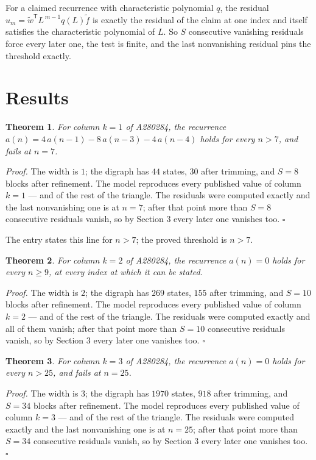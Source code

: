 \documentclass[11pt]{article}
\newtheorem{theorem}{Theorem}
\theoremstyle{definition}
\begin{document}
For a claimed recurrence with characteristic polynomial $q$, the residual $u_m = \tilde w^{\mathsf T}L^{\,m-1}q(L)\tilde f$ is exactly the residual of the claim at one index and itself satisfies the characteristic polynomial of $L$. So $S$ consecutive vanishing residuals force every later one, the test is finite, and the last nonvanishing residual pins the threshold exactly.

\section{Results}

\begin{theorem} For column $k = 1$ of A280284, the recurrence $a(n) = 4\,a(n-1) - 8\,a(n-3) - 4\,a(n-4)$ holds for every $n > 7$, and fails at $n = 7$.\end{theorem}

{\itshape Proof.} The width is $1$; the digraph has $44$ states, $30$ after trimming, and $S = 8$ blocks after refinement. The model reproduces every published value of column $k = 1$ --- and of the rest of the triangle. The residuals were computed exactly and the last nonvanishing one is at $n = 7$; after that point more than $S = 8$ consecutive residuals vanish, so by Section 3 every later one vanishes too. $\square$

The entry states this line for $n > 7$; the proved threshold is $n > 7$.

\begin{theorem} For column $k = 2$ of A280284, the recurrence $a(n) = 0$ holds for every $n \ge 9$, at every index at which it can be stated.\end{theorem}

{\itshape Proof.} The width is $2$; the digraph has $269$ states, $155$ after trimming, and $S = 10$ blocks after refinement. The model reproduces every published value of column $k = 2$ --- and of the rest of the triangle. The residuals were computed exactly and all of them vanish; after that point more than $S = 10$ consecutive residuals vanish, so by Section 3 every later one vanishes too. $\square$

\begin{theorem} For column $k = 3$ of A280284, the recurrence $a(n) = 0$ holds for every $n > 25$, and fails at $n = 25$.\end{theorem}

{\itshape Proof.} The width is $3$; the digraph has $1970$ states, $918$ after trimming, and $S = 34$ blocks after refinement. The model reproduces every published value of column $k = 3$ --- and of the rest of the triangle. The residuals were computed exactly and the last nonvanishing one is at $n = 25$; after that point more than $S = 34$ consecutive residuals vanish, so by Section 3 every later one vanishes too. $\square$
\end{document}
